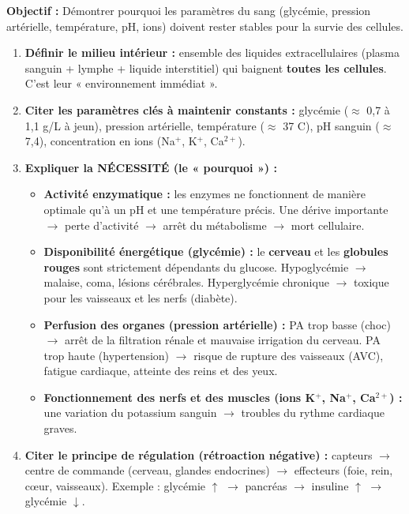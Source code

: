 \documentclass[11pt]{article}
\newcommand{\cle}[1]{{\popxbold\color{popdark}#1}}
\begin{document}
\begin{methode}
    \textbf{Objectif :} Démontrer pourquoi les paramètres du sang (glycémie, pression artérielle, température, pH, ions) doivent rester stables pour la survie des cellules.
    \begin{enumerate}
        \item \textbf{Définir le milieu intérieur :} ensemble des liquides extracellulaires (plasma sanguin + lymphe + liquide interstitiel) qui baignent \textbf{toutes les cellules}. C'est leur « environnement immédiat ».
        \item \textbf{Citer les paramètres clés à maintenir constants :} \cle{glycémie} ($\approx$ 0,7 à 1,1 g/L à jeun), \cle{pression artérielle}, \cle{température} ($\approx$ 37 \textdegree C), \cle{pH sanguin} ($\approx$ 7,4), concentration en \cle{ions} (Na$^+$, K$^+$, Ca$^{2+}$).
        \item \textbf{Expliquer la NÉCESSITÉ (le « pourquoi ») :}
            \begin{itemize}
                \item \textbf{Activité enzymatique :} les enzymes ne fonctionnent de manière optimale qu'à un pH et une température précis. Une dérive importante $\rightarrow$ perte d'activité $\rightarrow$ arrêt du métabolisme $\rightarrow$ mort cellulaire.
                \item \textbf{Disponibilité énergétique (glycémie) :} le \textbf{cerveau} et les \textbf{globules rouges} sont strictement dépendants du glucose. Hypoglycémie $\rightarrow$ malaise, coma, lésions cérébrales. Hyperglycémie chronique $\rightarrow$ toxique pour les vaisseaux et les nerfs (diabète).
                \item \textbf{Perfusion des organes (pression artérielle) :} PA trop basse (choc) $\rightarrow$ arrêt de la filtration rénale et mauvaise irrigation du cerveau. PA trop haute (hypertension) $\rightarrow$ risque de rupture des vaisseaux (AVC), fatigue cardiaque, atteinte des reins et des yeux.
                \item \textbf{Fonctionnement des nerfs et des muscles (ions K$^+$, Na$^+$, Ca$^{2+}$) :} une variation du potassium sanguin $\rightarrow$ troubles du rythme cardiaque graves.
            \end{itemize}
        \item \textbf{Citer le principe de régulation (rétroaction négative) :} capteurs $\rightarrow$ centre de commande (cerveau, glandes endocrines) $\rightarrow$ effecteurs (foie, rein, cœur, vaisseaux). Exemple : glycémie $\uparrow$ $\rightarrow$ pancréas $\rightarrow$ insuline $\uparrow$ $\rightarrow$ glycémie $\downarrow$.
    \end{enumerate}
\end{methode}
\end{document}
